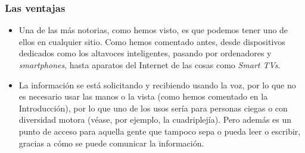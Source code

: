 \subsubsection{Las ventajas}
 \begin{itemize}
 	\item Una de las más notorias, como hemos visto, es que podemos tener uno de ellos en cualquier sitio. Como hemos comentado antes, desde dispositivos dedicados como los altavoces inteligentes, pasando por ordenadores y \textit{smartphones}, hasta aparatos del Internet de las cosas como \textit{Smart TVs}.
 	\item La información se está solicitando y recibiendo usando la voz, por lo que no es necesario usar las manos o la vista (como hemos comentado en la Introducción), por lo que uno de los usos sería para personas ciegas o con diversidad motora (véase, por ejemplo, la cuadriplejía). Pero además es un punto de acceso para aquella gente que tampoco sepa o pueda leer o escribir, gracias a cómo se puede comunicar la información.
 \end{itemize}
